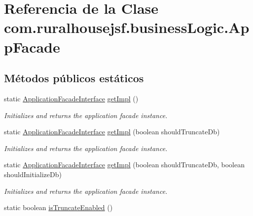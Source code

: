 \hypertarget{classcom_1_1ruralhousejsf_1_1business_logic_1_1_app_facade}{}\section{Referencia de la Clase com.\+ruralhousejsf.\+business\+Logic.\+App\+Facade}
\label{classcom_1_1ruralhousejsf_1_1business_logic_1_1_app_facade}
\subsection*{Métodos públicos estáticos}
\begin{DoxyCompactItemize}
\item 
static \mbox{\hyperlink{interfacecom_1_1ruralhousejsf_1_1business_logic_1_1_application_facade_interface}{Application\+Facade\+Interface}} \mbox{\hyperlink{classcom_1_1ruralhousejsf_1_1business_logic_1_1_app_facade_a029bcceee98b9070b9f80abc54db45d6}{get\+Impl}} ()
\begin{DoxyCompactList}\small\item\em Initializes and returns the application facade instance. \end{DoxyCompactList}\item 
static \mbox{\hyperlink{interfacecom_1_1ruralhousejsf_1_1business_logic_1_1_application_facade_interface}{Application\+Facade\+Interface}} \mbox{\hyperlink{classcom_1_1ruralhousejsf_1_1business_logic_1_1_app_facade_aa4bf7166aae19a2d640fd6ab8a0fff96}{get\+Impl}} (boolean should\+Truncate\+Db)
\begin{DoxyCompactList}\small\item\em Initializes and returns the application facade instance. \end{DoxyCompactList}\item 
static \mbox{\hyperlink{interfacecom_1_1ruralhousejsf_1_1business_logic_1_1_application_facade_interface}{Application\+Facade\+Interface}} \mbox{\hyperlink{classcom_1_1ruralhousejsf_1_1business_logic_1_1_app_facade_aab339d9b44293704c9214aef70c7c704}{get\+Impl}} (boolean should\+Truncate\+Db, boolean should\+Initialize\+Db)
\begin{DoxyCompactList}\small\item\em Initializes and returns the application facade instance. \end{DoxyCompactList}\item 
static boolean \mbox{\hyperlink{classcom_1_1ruralhousejsf_1_1business_logic_1_1_app_facade_a3638d881ea2d917df632a313d9ed9b20}{is\+Truncate\+Enabled}} ()

\end{DoxyCompactItemize}
